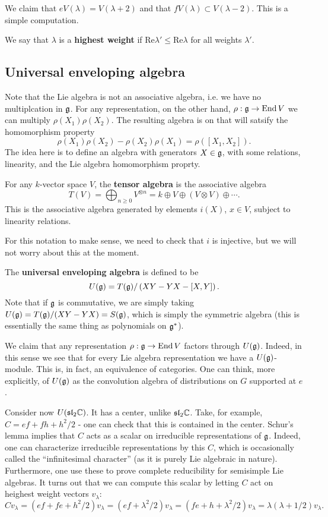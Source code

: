 \documentclass{../mathnotes}
\begin{document}
We claim that $eV(\lambda)=V(\lambda+2)$ and that $fV(\lambda)\subset V(\lambda-2)$. This is a simple computation.

\begin{defn}
    We say that $\lambda$ is a \textbf{highest weight} if $\text{Re}\lambda'\leq\text{Re}\lambda$ for all weights $\lambda'$.
\end{defn}

\subsection{Universal enveloping algebra}

Note that the Lie algebra is not an associative algebra, i.e. we have no multiplcation in $\mathfrak g$. For any representation, on the other hand,
$\rho:\mathfrak g\to\operatorname{End} V$ we can multiply $\rho(X_1)\rho(X_2)$. The resulting algebra is on that will satsify the homomorphism property
\[\rho(X_1)\rho(X_2)-\rho(X_2)\rho(X_1)=\rho([X_1,X_2]).\]
The idea here is to define an algebra with generators $X\in\mathfrak g$, with some relations, linearity, and the Lie algebra homomorphism proprty.

\begin{defn}
    For any $k$-vector space $V$, the \textbf{tensor algebra} is the associative algebra
    \[T(V)=\bigoplus_{n\geq 0}V^{\otimes n}=k\oplus V\oplus (V\otimes V)\oplus\cdots.\]
    This is the associative algebra generated by elements $i(X)$, $x\in V$, subject to linearity relations.
\end{defn}
For this notation to make sense, we need to check that $i$ is injective, but we will not worry about this at the moment.

\begin{defn}
    The \textbf{universal enveloping algebra} is defined to be
    \[U(\mathfrak g)=T(\mathfrak g)/\left( XY-YX-[X,Y] \right).\]
    Note that if $\mathfrak g$ is commutative, we are simply taking $U(\mathfrak g)=T(\mathfrak g)/(XY-YX)=S(\mathfrak g)$, which is simply the symmetric algebra
    (this is essentially the same thing as polynomials on $\mathfrak g^*$).
\end{defn}

We claim that any representation $\rho:\mathfrak g\to\operatorname{End} V$ factors through $U(\mathfrak g)$. Indeed, in this sense we see that for every Lie algebra representation
we have a $U(\mathfrak g)$-module. This is, in fact, an equivalence of categories. One can think, more explicitly, of $U(\mathfrak g)$ as the convolution algebra of
distributions on $G$ supported at $e$. 

Consider now $U(\mathfrak{sl}_2\mathbb{C})$. It has a center, unlike $\mathfrak{sl}_2\mathbb{C}$. Take, for example, $C=ef+fh+h^2/2$ - one can check that this is contained in the center.
Schur's lemma implies that $C$ acts as a scalar on irreducible representations of $\mathfrak g$. Indeed, one can characterize irreducible representations by this $C$,
which is occasionally called the ``infinitesimal character'' (as it is purely Lie algebraic in nature). Furthermore, one use these to prove complete reducibility
for semisimple Lie algebras. It turns out that we can compute this scalar by letting $C$ act on heighest weight vectors $v_\lambda$:
\[Cv_\lambda=(ef+fe+h^2/2)v_\lambda=(ef+\lambda^2/2)v_\lambda=(fe+h+\lambda^2/2)v_\lambda=\lambda\left( \lambda+1/2 \right)v_\lambda.\]
\end{document}
